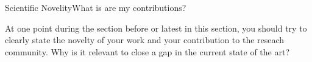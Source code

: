 \begin{frame}[t]{Scientific Novelity}{What is are my contributions?}

At one point during the section before or latest in this section, you should try to clearly state the novelty of your work and your contribution to the reseach community.
Why is it relevant to close a gap in the current state of the art?

\end{frame}